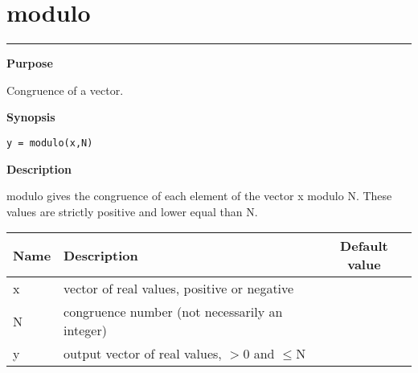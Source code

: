 


\section*{\hspace*{-1.6cm} modulo}

\vspace*{-.4cm}
\hspace*{-1.6cm}\rule[0in]{16.5cm}{.02cm}
\vspace*{.2cm}



{\bf \large \sf Purpose}\\
\hspace*{1.5cm}
\begin{minipage}[t]{13.5cm}
Congruence of a vector.
\end{minipage}
\vspace*{.5cm}


{\bf \large \sf Synopsis}\\
\hspace*{1.5cm}
\begin{minipage}[t]{13.5cm}
\begin{verbatim}
y = modulo(x,N)
\end{verbatim}
\end{minipage}
\vspace*{.5cm}


{\bf \large \sf Description}\\
\hspace*{1.5cm}
\begin{minipage}[t]{13.5cm}
        {\ty modulo} gives the congruence of each element of the vector
   {\ty x} modulo {\ty N}. These values are strictly positive and lower
   equal than {\ty N}.\\

\hspace*{-.5cm}\begin{tabular*}{14cm}{p{1.5cm} p{8.5cm} c}
Name & Description & Default value\\
\hline
	{\ty x} & vector of real values, positive or negative\\
	{\ty N} & congruence number (not necessarily an integer)\\
\hline	{\ty y} & output vector of real values, $>$0 and $\leq${\ty N}\\

\hline
\end{tabular*}

\end{minipage}
\vspace*{1cm}


